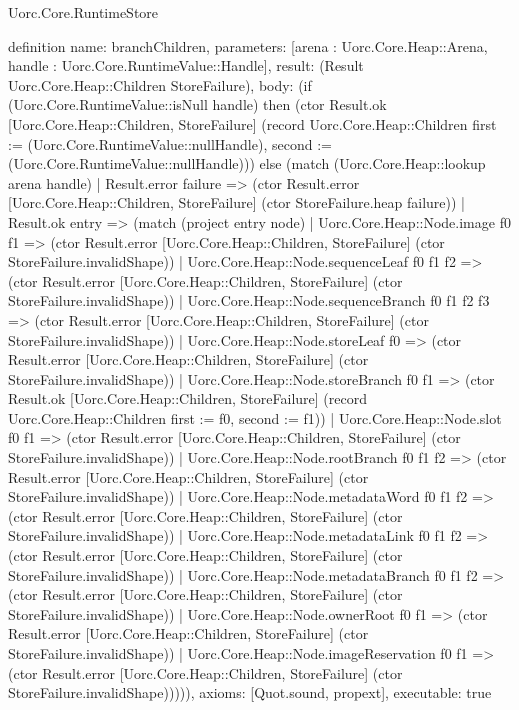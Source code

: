 \begin{lexlean}{Uorc.Core.RuntimeStore}
\begin{semanticmodule}
definition{
  name: branchChildren,
  parameters: [arena : Uorc.Core.Heap::Arena, handle : Uorc.Core.RuntimeValue::Handle],
  result: (Result Uorc.Core.Heap::Children StoreFailure),
  body: (if (Uorc.Core.RuntimeValue::isNull handle) then (ctor Result.ok [Uorc.Core.Heap::Children, StoreFailure] (record Uorc.Core.Heap::Children {first := (Uorc.Core.RuntimeValue::nullHandle), second := (Uorc.Core.RuntimeValue::nullHandle)})) else (match (Uorc.Core.Heap::lookup arena handle)
    | Result.error failure => (ctor Result.error [Uorc.Core.Heap::Children, StoreFailure] (ctor StoreFailure.heap failure))
    | Result.ok entry => (match (project entry node)
      | Uorc.Core.Heap::Node.image f0 f1 => (ctor Result.error [Uorc.Core.Heap::Children, StoreFailure] (ctor StoreFailure.invalidShape))
      | Uorc.Core.Heap::Node.sequenceLeaf f0 f1 f2 => (ctor Result.error [Uorc.Core.Heap::Children, StoreFailure] (ctor StoreFailure.invalidShape))
      | Uorc.Core.Heap::Node.sequenceBranch f0 f1 f2 f3 => (ctor Result.error [Uorc.Core.Heap::Children, StoreFailure] (ctor StoreFailure.invalidShape))
      | Uorc.Core.Heap::Node.storeLeaf f0 => (ctor Result.error [Uorc.Core.Heap::Children, StoreFailure] (ctor StoreFailure.invalidShape))
      | Uorc.Core.Heap::Node.storeBranch f0 f1 => (ctor Result.ok [Uorc.Core.Heap::Children, StoreFailure] (record Uorc.Core.Heap::Children {first := f0, second := f1}))
      | Uorc.Core.Heap::Node.slot f0 f1 => (ctor Result.error [Uorc.Core.Heap::Children, StoreFailure] (ctor StoreFailure.invalidShape))
      | Uorc.Core.Heap::Node.rootBranch f0 f1 f2 => (ctor Result.error [Uorc.Core.Heap::Children, StoreFailure] (ctor StoreFailure.invalidShape))
      | Uorc.Core.Heap::Node.metadataWord f0 f1 f2 => (ctor Result.error [Uorc.Core.Heap::Children, StoreFailure] (ctor StoreFailure.invalidShape))
      | Uorc.Core.Heap::Node.metadataLink f0 f1 f2 => (ctor Result.error [Uorc.Core.Heap::Children, StoreFailure] (ctor StoreFailure.invalidShape))
      | Uorc.Core.Heap::Node.metadataBranch f0 f1 f2 => (ctor Result.error [Uorc.Core.Heap::Children, StoreFailure] (ctor StoreFailure.invalidShape))
      | Uorc.Core.Heap::Node.ownerRoot f0 f1 => (ctor Result.error [Uorc.Core.Heap::Children, StoreFailure] (ctor StoreFailure.invalidShape))
      | Uorc.Core.Heap::Node.imageReservation f0 f1 => (ctor Result.error [Uorc.Core.Heap::Children, StoreFailure] (ctor StoreFailure.invalidShape))))),
  axioms: [Quot.sound, propext],
  executable: true
}


\end{semanticmodule}
\end{lexlean}
